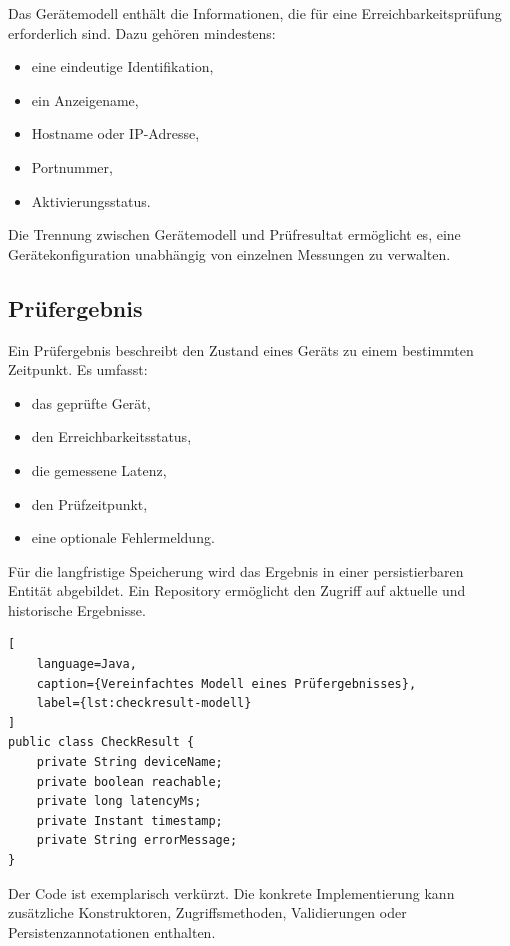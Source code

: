 Das Gerätemodell enthält die Informationen, die für eine Erreichbarkeitsprüfung erforderlich sind. Dazu gehören mindestens:

\begin{itemize}
    \item eine eindeutige Identifikation,
    \item ein Anzeigename,
    \item Hostname oder IP-Adresse,
    \item Portnummer,
    \item Aktivierungsstatus.
\end{itemize}

Die Trennung zwischen Gerätemodell und Prüfresultat ermöglicht es, eine Gerätekonfiguration unabhängig von einzelnen Messungen zu verwalten.

\subsection{Prüfergebnis}
\label{subsec:pruefergebnis}

Ein Prüfergebnis beschreibt den Zustand eines Geräts zu einem bestimmten Zeitpunkt. Es umfasst:

\begin{itemize}
    \item das geprüfte Gerät,
    \item den Erreichbarkeitsstatus,
    \item die gemessene Latenz,
    \item den Prüfzeitpunkt,
    \item eine optionale Fehlermeldung.
\end{itemize}

Für die langfristige Speicherung wird das Ergebnis in einer persistierbaren Entität abgebildet. Ein Repository ermöglicht den Zugriff auf aktuelle und historische Ergebnisse.

\begin{lstlisting}[
    language=Java,
    caption={Vereinfachtes Modell eines Prüfergebnisses},
    label={lst:checkresult-modell}
]
public class CheckResult {
    private String deviceName;
    private boolean reachable;
    private long latencyMs;
    private Instant timestamp;
    private String errorMessage;
}
\end{lstlisting}

Der Code ist exemplarisch verkürzt. Die konkrete Implementierung kann zusätzliche Konstruktoren, Zugriffsmethoden, Validierungen oder Persistenzannotationen enthalten.

